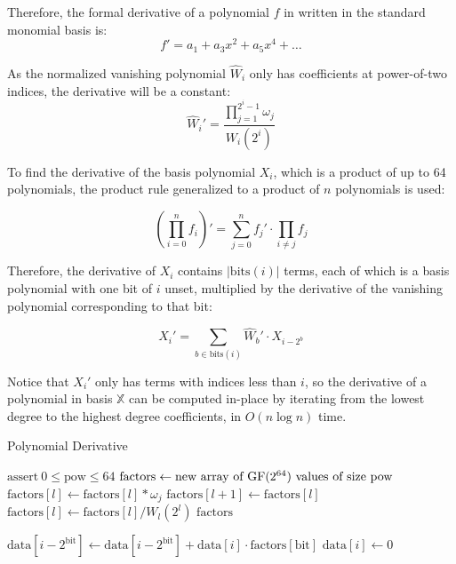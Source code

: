 Therefore, the formal derivative of a polynomial $f$ in  written in the standard monomial basis is:
\[f' = a_1 + a_3 x^2 + a_5 x^4 + \ldots\]

As the normalized vanishing polynomial $\hat{W}_i$ only has coefficients at power-of-two indices, the derivative will be a constant:
\[\hat{W}_i' = \frac{\prod_{j = 1}^{2^i - 1} \omega_j}{W_i(2^i)}\]

To find the derivative of the basis polynomial $X_i$, which is a product of up to 64 polynomials, the product rule generalized to a product of $n$ polynomials is used:

\[
(\prod_{i = 0}^{n} f_i)' = \sum_{j = 0}^{n} f_j' \cdot \prod_{i \neq j} f_j
\]

Therefore, the derivative of $X_i$ contains $|\text{bits}(i)|$ terms, each of which is a basis polynomial with one bit of $i$ unset, multiplied by the derivative of the vanishing polynomial corresponding to that bit:

\[
X_i' = \sum_{b \in \text{bits}(i)} \hat{W}_b' \cdot X_{i - 2^b}
\]

Notice that $X_i'$ only has terms with indices less than $i$, so the derivative of a polynomial in basis $\mathbb{X}$ can be computed in-place by iterating from the lowest degree to the highest degree coefficients, in $O(n \log n)$ time.

\begin{algorithm}
    \caption{Polynomial Derivative}
    \begin{algorithmic}
            \State $\text{assert}\ 0 \leq \text{pow} \le 64$
            \State $\text{factors} \gets \text{new array of $\text{GF}(2^{64})$ values of size } \text{pow}$
                    \State $\text{factors}[l] \gets \text{factors}[l] * \omega_j$
                \EndFor
                    \State $\text{factors}[l + 1] \gets \text{factors}[l]$
                \EndIf
                \State $\text{factors}[l] \gets \text{factors}[l] / W_l(2^l)$
            \EndFor
            \State \Return $\text{factors}$
        \EndFunction
    \end{algorithmic}
    \begin{algorithmic}
                        \State $\text{data}[i - 2^{\text{bit}}] \gets \text{data}[i - 2^{\text{bit}}] + \text{data}[i] \cdot \text{factors}[\text{bit}]$
                    \EndIf
                \EndFor
                \State $\text{data}[i] \gets 0$
            \EndFor
        \EndFunction
    \end{algorithmic}
\end{algorithm}

